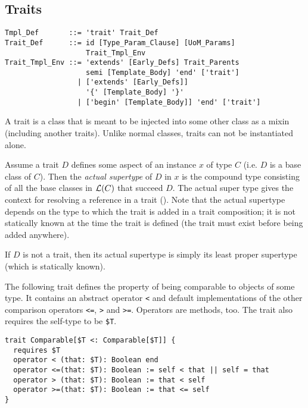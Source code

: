 \subsection{Traits}
\label{sec:traits}

\syntax\begin{lstlisting}
Tmpl_Def       ::= 'trait' Trait_Def
Trait_Def      ::= id [Type_Param_Clause] [UoM_Params] 
                   Trait_Tmpl_Env
Trait_Tmpl_Env ::= 'extends' [Early_Defs] Trait_Parents
                   semi [Template_Body] 'end' ['trait']
                 | ['extends' [Early_Defs]] 
                   '{' [Template_Body] '}'
                 | ['begin' [Template_Body]] 'end' ['trait']
\end{lstlisting}

A trait is a class that is meant to be injected into some other class as a mixin (including another traits). Unlike normal classes, traits can not be instantiated alone. 

Assume a trait $D$ defines some aspect of an instance $x$ of type $C$ (i.e. $D$ is a base class of $C$). Then the {\em actual supertype} of $D$ in $x$ is the compound type consisting of all the base classes in ${\cal L}(C)$ that succeed $D$. The actual super type gives the context for resolving a  reference in a trait (). Note that the actual supertype depends on the type to which the trait is added in a trait composition; it is not statically known at the time the trait is defined (the trait must exist before being added anywhere). 

If $D$ is not a trait, then its actual supertype is simply its least proper supertype (which is statically known). 

\example The following trait defines the property of being comparable to objects of some type. It contains an abstract operator \lstinline!<! and default implementations of the other comparison operators \lstinline!<=!, \lstinline!>! and \lstinline!>=!. Operators are methods, too. The trait also requires the self-type to be \lstinline[mathescape=false]!$T!. 
\begin{lstlisting}[mathescape=false]
trait Comparable[$T <: Comparable[$T]] {
  requires $T
  operator < (that: $T): Boolean end
  operator <=(that: $T): Boolean := self < that || self = that
  operator > (that: $T): Boolean := that < self
  operator >=(that: $T): Boolean := that <= self
}
\end{lstlisting}






